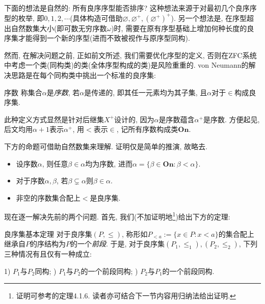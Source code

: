 下面的想法是自然的: 所有良序序型能否排序? 这种想法来源于对最初几个良序序型的枚举, 即$0,1,2,\cdots$(具体构造可借助$\varnothing , \varnothing ^{+}, (\varnothing ^+)^+$). 另一个想法是, 在序型超出自然数集大小(即可数无穷序数$\omega$)时, 需要在原有序型基础上增加何种长度的良序集才能得到一个新的序型(进而不致被视作与原序型同构). 

然而, 在解决问题之前, 正如前文所述, 我们需要优化序型的定义, 否则在ZFC系统中考虑一个类(同构类)的类(全体序型构成的类)是风险重重的. von Neumann的解决思路是在每个同构类中挑出一个标准的良序集: 

\begin{definition}{序数}
	称集合$\alpha$是\textit{序数}, 若$\alpha$是传递的, 即其任一元素均为其子集, 且$\alpha$对于$\in$构成良序集. 
\end{definition}

此种定义方式显然是针对后继集$X^+$设计的, 因为$\alpha$是序数蕴含$\alpha ^+$是序数. 方便起见, 后文均用$\alpha +1$表示$\alpha ^+$, 用$<$表示$\in$, 记所有序数构成类$\mathbf{On}$. 

下方的命题可借助自然数集来理解. 证明仅是简单的推演, 故略去. 

\begin{proposition}{}
	\vspace{-2em}
	\begin{itemize}
		\item 设序数$\alpha$, 则任意$\beta \in \alpha$均为序数, 进而$\alpha = \{ \beta \in \mathbf{On} : \beta < \alpha \}$. 
		\item 对于序数$\alpha ,\beta$, 若$\beta \subsetneq \alpha $则$\beta \in \alpha$. 
		\item 非空的序数集合配上$<$是良序集. 
	\end{itemize}
\end{proposition}

现在逐一解决先前的两个问题. 首先, 我们(不加证明地\footnote{证明可参考\cite{set_theory_Hao}的定理4.1.6. 读者亦可结合下一节内容用归纳法给出证明. })给出下方的定理: 

\begin{theorem}{良序集基本定理}
	对于良序集$(P,\leq )$, 称形如$P_{<a}:=\{ x \in P:x<a \}$的集合配上继承自$P$的序结构为$P$的一个\textit{前段}. 于是, 对于良序集$(P_1,\leq _1),(P_2,\leq _2)$, 下列三种情况有且仅有一种成立: 
	\begin{center}
		1) $P_1$与$P_2$同构; ) $P_1$与$P_2$的一个前段同构; ) $P_2$与$P_1$的一个前段同构. 
	\end{center}
\end{theorem}


